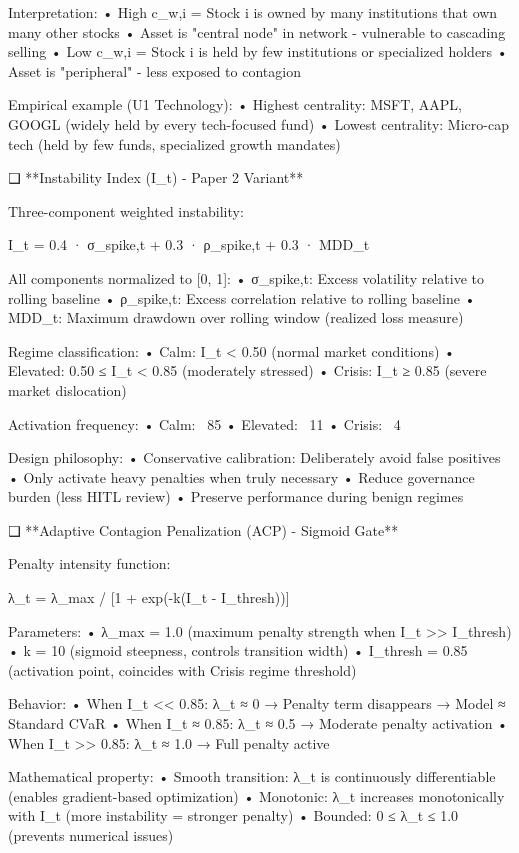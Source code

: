 Interpretation:
   • High c_w,i = Stock i is owned by many institutions that own many other stocks
   • Asset is "central node" in network - vulnerable to cascading selling
   • Low c_w,i = Stock i is held by few institutions or specialized holders
   • Asset is "peripheral" - less exposed to contagion

Empirical example (U1 Technology):
   • Highest centrality: MSFT, AAPL, GOOGL (widely held by every tech-focused fund)
   • Lowest centrality: Micro-cap tech (held by few funds, specialized growth mandates)

❑ **Instability Index (I_t) - Paper 2 Variant**

Three-component weighted instability:

I_t = 0.4 · σ_{spike,t} + 0.3 · ρ_{spike,t} + 0.3 · MDD_t

All components normalized to [0, 1]:
   • σ_{spike,t}: Excess volatility relative to rolling baseline
   • ρ_{spike,t}: Excess correlation relative to rolling baseline
   • MDD_t: Maximum drawdown over rolling window (realized loss measure)

Regime classification:
   • Calm:     I_t < 0.50 (normal market conditions)
   • Elevated: 0.50 ≤ I_t < 0.85 (moderately stressed)
   • Crisis:   I_t ≥ 0.85 (severe market dislocation)

Activation frequency:
   • Calm: ~85%
   • Elevated: ~11%
   • Crisis: ~4%

Design philosophy:
   • Conservative calibration: Deliberately avoid false positives
   • Only activate heavy penalties when truly necessary
   • Reduce governance burden (less HITL review)
   • Preserve performance during benign regimes

❑ **Adaptive Contagion Penalization (ACP) - Sigmoid Gate**

Penalty intensity function:

λ_t = λ_{max} / [1 + exp(-k(I_t - I_{thresh}))]

Parameters:
   • λ_{max} = 1.0 (maximum penalty strength when I_t >> I_{thresh})
   • k = 10 (sigmoid steepness, controls transition width)
   • I_{thresh} = 0.85 (activation point, coincides with Crisis regime threshold)

Behavior:
   • When I_t << 0.85: λ_t ≈ 0 → Penalty term disappears → Model ≈ Standard CVaR
   • When I_t ≈ 0.85: λ_t ≈ 0.5 → Moderate penalty activation
   • When I_t >> 0.85: λ_t ≈ 1.0 → Full penalty active

Mathematical property:
   • Smooth transition: λ_t is continuously differentiable (enables gradient-based optimization)
   • Monotonic: λ_t increases monotonically with I_t (more instability = stronger penalty)
   • Bounded: 0 ≤ λ_t ≤ 1.0 (prevents numerical issues)

